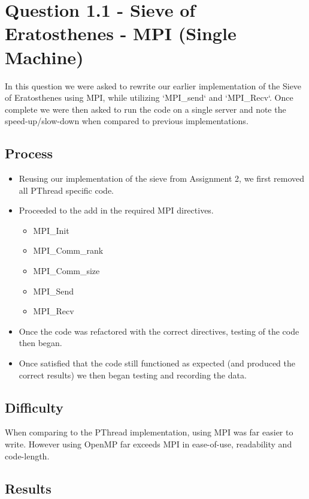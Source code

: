 \section*{Question 1.1 - Sieve of Eratosthenes - MPI (Single Machine)}

In this question we were asked to rewrite our earlier implementation of the 
Sieve of Eratosthenes using MPI, while utilizing `MPI\_send` and `MPI\_Recv`. 
Once complete we were then asked to run the code on a single server and note the 
speed-up/slow-down when compared to previous implementations.

\subsection*{Process}

\begin{itemize}
\item Reusing our implementation of the sieve from Assignment 2, we first 
removed all PThread specific code.
\item Proceeded to the add in the required MPI directives.
  \begin{itemize}
    \item MPI\_Init
    \item MPI\_Comm\_rank
    \item MPI\_Comm\_size
    \item MPI\_Send
    \item MPI\_Recv
  \end{itemize}
\item Once the code was refactored with the correct directives, testing of the 
code then began.
\item Once satisfied that the code still functioned as expected (and produced 
the correct results) we then began testing and recording the data.
\end{itemize}

\subsection*{Difficulty}

When comparing to the PThread implementation, using MPI was far easier to write. 
However using OpenMP far exceeds MPI in ease-of-use, readability and code-length.

\subsection*{Results}

